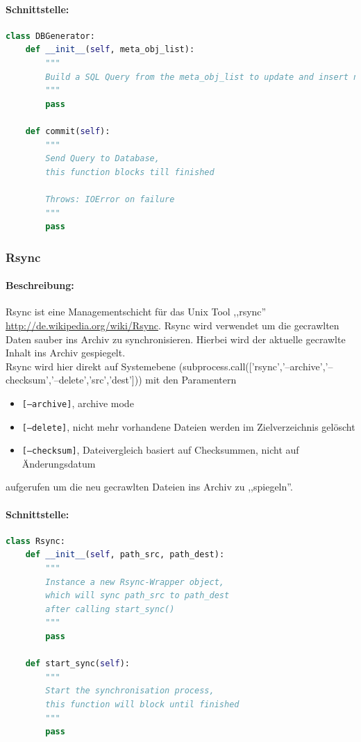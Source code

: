 \paragraph{Schnittstelle:}
\label{par:schnittstelle_}
\begin{lstlisting}[language=python]
class DBGenerator:
    def __init__(self, meta_obj_list):
        """
        Build a SQL Query from the meta_obj_list to update and insert new items the Database 
        """
        pass

    def commit(self):
        """
        Send Query to Database,
        this function blocks till finished

        Throws: IOError on failure
        """
        pass
\end{lstlisting}


\subsubsection{Rsync}
\label{ssub:rsync}
\paragraph{Beschreibung:}
\label{par:beschreibung_}
Rsync ist eine Managementschicht für das Unix Tool ,,rsync'' \url{http://de.wikipedia.org/wiki/Rsync}. Rsync wird verwendet um die gecrawlten Daten sauber ins Archiv zu synchronisieren.
Hierbei wird der aktuelle gecrawlte Inhalt ins Archiv gespiegelt.
\\
Rsync wird hier direkt auf Systemebene (subprocess.call(['rsync','--archive','--checksum','--delete','src','dest'])) mit den Paramentern
\begin{itemize}
    \item \texttt{[--archive]}, archive mode
    \item \texttt{[--delete]}, nicht mehr vorhandene Dateien werden im Zielverzeichnis gelöscht
    \item \texttt{[--checksum]}, Dateivergleich basiert auf Checksummen, nicht auf Änderungsdatum
\end{itemize}
aufgerufen um die neu gecrawlten Dateien ins Archiv zu ,,spiegeln''.

\paragraph{Schnittstelle:}
\label{par:schnittstelle_}
\begin{lstlisting}[language=python]
class Rsync:
    def __init__(self, path_src, path_dest):
        """
        Instance a new Rsync-Wrapper object,
        which will sync path_src to path_dest
        after calling start_sync() 
        """
        pass

    def start_sync(self):
        """
        Start the synchronisation process,
        this function will block until finished
        """
        pass
\end{lstlisting}

